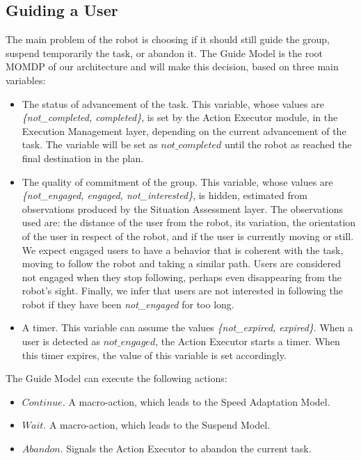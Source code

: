 \subsection{Guiding a User}
The main problem of the robot is choosing if it should still guide the group, suspend temporarily the task, or abandon it. The Guide Model is the root MOMDP of our architecture and will make this decision, based on three main variables: 
\begin{itemize}
\item The status of advancement of the task. This variable, whose values are \textit{\{not\_completed, completed\}}, is set by the Action Executor module, in the Execution Management layer, depending on the current advancement of the task. The variable will be set as $not\_completed$ until the robot as reached the final destination in the plan. 
\item The quality of commitment of the group. This variable, whose values are \textit{\{not\_engaged, engaged, not\_interested\}}, is hidden, estimated from observations produced by the Situation Assessment layer. The observations used are: the distance of the user from the robot, its variation, the orientation of the user in respect of the  robot, and if the user is currently moving or still. We expect engaged users to have a behavior that is coherent with the task, moving to follow the robot and taking a similar path. Users are considered not engaged when they stop following, perhaps even disappearing from the robot's sight. Finally, we infer that users are not interested in following the robot if they have been \textit{not\_engaged}  for too long.
\item A timer. This variable can assume the values \textit{\{not\_expired, expired\}}. When a user is detected as $not\_engaged$, the Action Executor starts a timer. When this timer expires, the value of this variable is set accordingly.
\end{itemize}

The Guide Model can execute the following actions:
\begin{itemize}
\item $Continue$. A macro-action, which leads to the Speed Adaptation Model.
\item $Wait$. A macro-action, which leads to the Suspend Model.
\item $Abandon$. Signals the Action Executor to abandon the current task.
\end{itemize}

